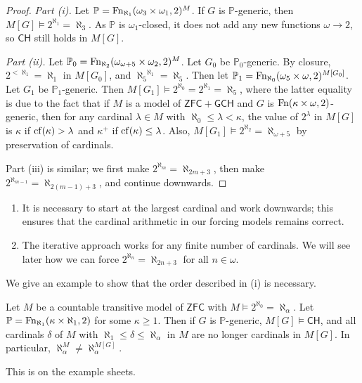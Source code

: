 \begin{proof}
    \emph{Part (i).}
    Let \( \mathbb P = \operatorname{Fn}_{\aleph_1}(\omega_3 \times \omega_1, 2)^M \).
    If \( G \) is \( \mathbb P \)-generic, then \( M[G] \vDash 2^{\aleph_1} = \aleph_3 \).
    As \( \mathbb P \) is \( \omega_1 \)-closed, it does not add any new functions \( \omega \to 2 \), so \( \mathsf{CH} \) still holds in \( M[G] \).

    \emph{Part (ii).}
    Let \( \mathbb P_0 = \operatorname{Fn}_{\aleph_2}(\omega_{\omega + 5} \times \omega_2, 2)^M \).
    Let \( G_0 \) be \( \mathbb P_0 \)-generic.
    By closure, \( 2^{<\aleph_1} = \aleph_1 \) in \( M[G_0] \), and \( {\aleph_5}^{\aleph_1} = \aleph_5 \).
    Then let \( \mathbb P_1 = \operatorname{Fn}_{\aleph_0}(\omega_5 \times \omega, 2)^{M[G_0]} \).
    Let \( G_1 \) be \( \mathbb P_1 \)-generic.
    Then \( M[G_1] \vDash 2^{\aleph_0} = 2^{\aleph_1} = \aleph_5 \), where the latter equality is due to the fact that if \( M \) is a model of \( \mathsf{ZFC} + \mathsf{GCH} \) and \( G \) is \( \operatorname{Fn}(\kappa \times \omega, 2) \)-generic, then for any cardinal \( \lambda \in M \) with \( \aleph_0 \leq \lambda < \kappa \), the value of \( 2^\lambda \) in \( M[G] \) is \( \kappa \) if \( \operatorname{cf}(\kappa) > \lambda \) and \( \kappa^+ \) if \( \operatorname{cf}(\kappa) \leq \lambda \).
    Also, \( M[G_1] \vDash 2^{\aleph_2} = \aleph_{\omega + 5} \) by preservation of cardinals.

    Part (iii) is similar; we first make \( 2^{\aleph_m} = \aleph_{2m+3} \), then make \( 2^{\aleph_{m-1}} = \aleph_{2(m-1)+3} \), and continue downwards.
\end{proof}
\begin{remark}
    \begin{enumerate}
        \item It is necessary to start at the largest cardinal and work downwards; this ensures that the cardinal arithmetic in our forcing models remains correct.
        \item The iterative approach works for any finite number of cardinals.
        We will see later how we can force \( 2^{\aleph_n} = \aleph_{2n + 3} \) for all \( n \in \omega \).
    \end{enumerate}
\end{remark}
We give an example to show that the order described in (i) is necessary.
\begin{proposition}
    Let \( M \) be a countable transitive model of \( \mathsf{ZFC} \) with \( M \vDash 2^{\aleph_0} = \aleph_\alpha \).
    Let \( \mathbb P = \operatorname{Fn}_{\aleph_1}(\kappa \times \aleph_1, 2) \) for some \( \kappa \geq 1 \).
    Then if \( G \) is \( \mathbb P \)-generic, \( M[G] \vDash \mathsf{CH} \), and all cardinals \( \delta \) of \( M \) with \( \aleph_1 \leq \delta \leq \aleph_\alpha \) in \( M \) are no longer cardinals in \( M[G] \).
    In particular, \( \aleph_\alpha^M \neq \aleph_\alpha^{M[G]} \).
\end{proposition}
This is on the example sheets.
